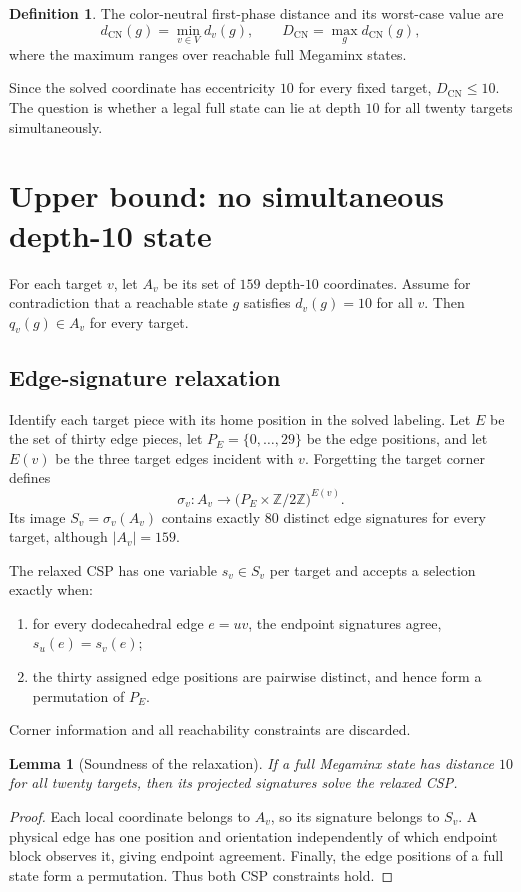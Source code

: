 \documentclass[11pt]{article}
\newtheorem{lemma}[theorem]{Lemma}
\theoremstyle{definition}
\newtheorem{definition}[theorem]{Definition}
\newcommand{\DCN}{D_{\mathrm{CN}}}
\newcommand{\dCN}{d_{\mathrm{CN}}}
\begin{document}
\begin{definition}
The color-neutral first-phase distance and its worst-case value are
\[
\dCN(g)=\min_{v\in V}d_v(g),
\qquad
\DCN=\max_{g}\dCN(g),
\]
where the maximum ranges over reachable full Megaminx states.
\end{definition}

Since the solved coordinate has eccentricity $10$ for every fixed target, $\DCN\le10$.  The question is whether a legal full state can lie at depth $10$ for all twenty targets simultaneously.

\section{Upper bound: no simultaneous depth-10 state}

For each target $v$, let $A_v$ be its set of $159$ depth-$10$ coordinates.  Assume for contradiction that a reachable state $g$ satisfies $d_v(g)=10$ for all $v$.  Then $q_v(g)\in A_v$ for every target.

\subsection{Edge-signature relaxation}

Identify each target piece with its home position in the solved labeling.  Let $E$ be the set of thirty edge pieces, let $P_E=\{0,\ldots,29\}$ be the edge positions, and let $E(v)$ be the three target edges incident with $v$.  Forgetting the target corner defines
\[
\sigma_v:A_v\longrightarrow
\bigl(P_E\times\mathbb Z/2\mathbb Z\bigr)^{E(v)}.
\]
Its image $S_v=\sigma_v(A_v)$ contains exactly $80$ distinct edge signatures for every target, although $|A_v|=159$.

The relaxed CSP has one variable $s_v\in S_v$ per target and accepts a selection exactly when:
\begin{enumerate}
  \item for every dodecahedral edge $e=uv$, the endpoint signatures agree, $s_u(e)=s_v(e)$;
  \item the thirty assigned edge positions are pairwise distinct, and hence form a permutation of $P_E$.
\end{enumerate}
Corner information and all reachability constraints are discarded.

\begin{lemma}[Soundness of the relaxation]\label{lem:relaxation-sound}
If a full Megaminx state has distance $10$ for all twenty targets, then its projected signatures solve the relaxed CSP.
\end{lemma}
\begin{proof}
Each local coordinate belongs to $A_v$, so its signature belongs to $S_v$.  A physical edge has one position and orientation independently of which endpoint block observes it, giving endpoint agreement.  Finally, the edge positions of a full state form a permutation.  Thus both CSP constraints hold.
\end{proof}
\end{document}

